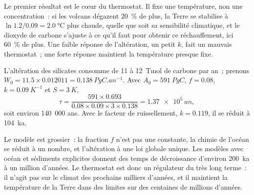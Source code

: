 Le premier résultat est le cœur du thermostat. Il fixe une température, non une concentration~: si
les volcans dégazent \qty{20}{\percent} de plus, la Terre se stabilise à $\ln 1.2/0.09 = \qty{2.0}{\celsius}$
plus chaude, quelle que soit sa sensibilité climatique, et le dioxyde de carbone s'ajuste à ce qu'il faut pour
obtenir ce réchauffement, ici \qty{60}{\percent} de plus. Une faible réponse de l'altération, un petit $k$, fait un mauvais
thermostat~; une forte réponse maintient la température presque fixe.

\begin{example}\label{ex:b2:deep-time-climate:tau}
L'altération des silicates consomme de 11 à \qty{12}{Tmol} de carbone par an~; prenons $W_0 = 11.5\times0.012011
= \qty{0.138}{PgC.an^{-1}}$. Avec $A_0 = \qty{591}{PgC}$, $f = 0.08$, $k = \qty{0.09}{K^{-1}}$ et
$S = \qty{3}{K}$,
\[
  \tau = \frac{591\times0.693}{0.08\times0.09\times3\times0.138} = \qty{1.37e5}{an} ,
\]
soit environ 140~000 ans. Avec le facteur de ruissellement, $k = 0.119$, il se réduit à
\qty{104}{ka}.
\end{example}

Le modèle est grossier~: la fraction $f$ n'est pas une constante, la chimie de l'océan se réduit à un
nombre, et l'altération à une loi globale unique. Les modèles avec océan et sédiments explicites donnent des
temps de décroissance d'environ \qty{200}{ka} à un million d'années. Le thermostat est donc un
régulateur du très long terme~: il n'agit pas sur le climat des prochains milliers d'années, et il
maintient la température de la Terre dans des limites sur des centaines de millions d'années.

